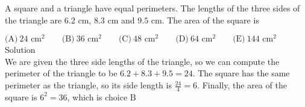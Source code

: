 

A square and a triangle have equal perimeters. The lengths of the three sides of the triangle are $6.2 \text{ cm}$, $8.3 \text{ cm}$ and $9.5 \text{ cm}$. The area of the square is

$\text{(A)}\ 24\text{ cm}^2 \qquad \text{(B)}\ 36\text{ cm}^2 \qquad \text{(C)}\ 48\text{ cm}^2 \qquad \text{(D)}\ 64\text{ cm}^2 \qquad \text{(E)}\ 144\text{ cm}^2$
\\
Solution
\\
We are given the three side lengths of the triangle, so we can compute the perimeter of the triangle to be $6.2+8.3+9.5=24$. The square has the same perimeter as the triangle, so its side length is $\frac{24}{4}=6$. Finally, the area of the square is $6^2=36$, which is choice $\boxed{\text{B}}$

